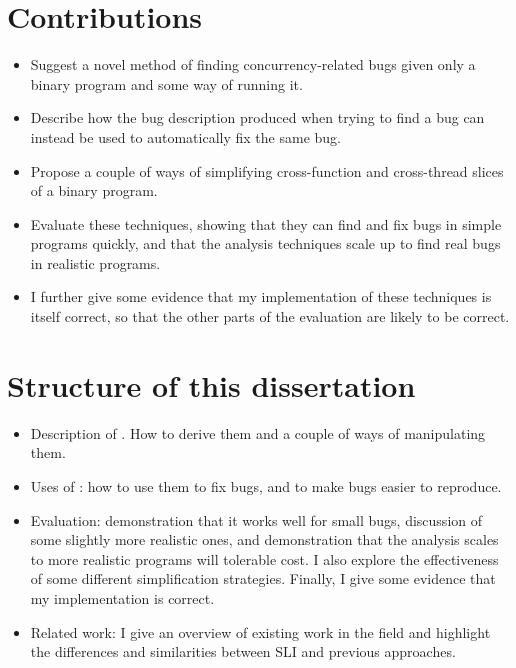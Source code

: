 \section{Contributions}

\begin{itemize}
\item
  Suggest a novel method of finding concurrency-related bugs given
  only a binary program and some way of running it.
\item
  Describe how the bug description produced when trying to find a bug
  can instead be used to automatically fix the same bug.
\item
  Propose a couple of ways of simplifying cross-function and
  cross-thread slices of a binary program.
\item
  Evaluate these techniques, showing that they can find and fix bugs
  in simple programs quickly, and that the analysis techniques
   scale up to find real bugs in realistic
  programs.
\item
  I further give some evidence that my implementation of these
  techniques is itself correct, so that the other parts of the
  evaluation are likely to be correct.
\end{itemize}


\section{Structure of this dissertation}

\begin{itemize}
\item Description of \StateMachines.  How to derive them and a couple
  of ways of manipulating them.
\item Uses of \StateMachines: how to use them to fix bugs, and to make
  bugs easier to reproduce.
\item Evaluation: demonstration that it works well for small bugs,
  discussion of some slightly more realistic ones, and demonstration
  that the analysis scales to more realistic programs will tolerable
  cost.  I also explore the effectiveness of some different
  \StateMachine simplification strategies.  Finally, I give some
  evidence that my implementation is correct.
\item Related work: I give an overview of existing work in the field
  and highlight the differences and similarities between SLI and
  previous approaches.
\end{itemize}

